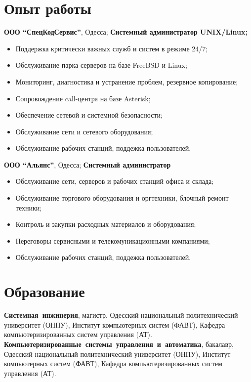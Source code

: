 \documentclass[12pt,a4paper,serif]{moderncv}
\begin{document}
	\section{Опыт работы}
			{\textbf{ООО ``СпецКодСервис''}, Одесса;
			\newline\textbf{Системный администратор	UNIX/Linux;}
			\begin{itemize}
				\item Поддержка критически важных служб и систем в режиме 24/7;
			    \item Обслуживание парка серверов на базе FreeBSD и Linux;
			    \item Мониторинг, диагностика и устранение проблем, резервное
			    копирование;
			    \item Сопровождение call-центра на базе Asterisk;
			    \item Обеспечение сетевой и системной безопасности;
			    \item Обслуживание сети и сетевого оборудования;
			    \item Обслуживание рабочих станций, поддежка пользователей.
			\end{itemize}}
			{\textbf{ООО ``Альянс''}, Одесса;
			\newline\textbf{Системный администратор}
			\begin{itemize}
			    \item Обслуживание сети, серверов и рабочих станций офиса
			    и склада;
			    \item Обслуживание торгового оборудования и оргтехники, блочный ремонт
			    техники;
			    \item Контроль и закупки расходных материалов и оборудования;
			    \item Переговоры сервисными и телекомуникационными компаниями;
			    \item Обслуживание рабочих станций, поддежка пользователей.
			\end{itemize}}

	\section{Образование}
			{\textbf{\mbox{Системная инжинерия}}, магистр,
			\newline Одесский национальный политехнический университет (ОНПУ),
			\newline Институт компьютерных систем (ФАВТ),
			\newline Кафедра компьютеризированных систем управления (АТ).}
			{\textbf{\mbox{Компьютеризированные системы управления и автоматика}},
				бакалавр,
			\newline Одесский национальный политехнический университет (ОНПУ),
			\newline Институт компьютерных систем (ФАВТ),
			\newline Кафедра компьютеризированных систем управления (АТ).}
		
\end{document}
